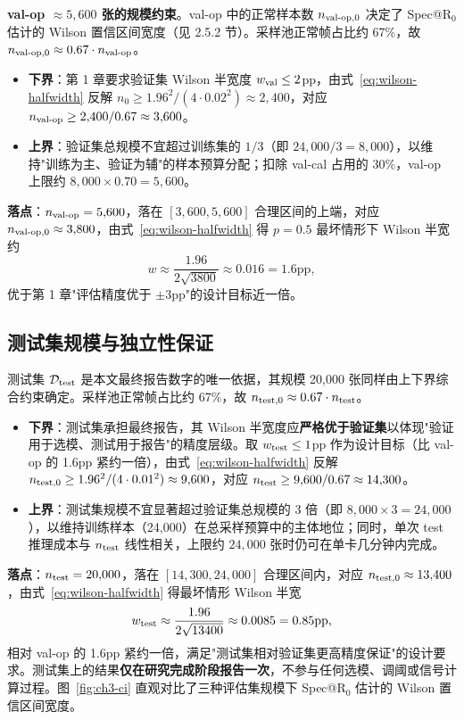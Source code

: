 \documentclass[UTF8,openany,12pt]{ctexbook}
\begin{document}
\textbf{val-op $\approx 5{,}600$ 张的规模约束}。val-op 中的正常样本数 $n_{\rm val\text{-}op, 0}$ 决定了 Spec@R$_0$ 估计的 Wilson 置信区间宽度（见 2.5.2 节）。采样池正常帧占比约 67\%，故 $n_{\rm val\text{-}op, 0} \approx 0.67 \cdot n_{\rm val\text{-}op}$。
\begin{itemize}[leftmargin=2em,nosep]
\item \textbf{下界}：第 1 章要求验证集 Wilson 半宽度 $w_{\rm val} \leq 2$pp，由式~\eqref{eq:wilson-halfwidth} 反解 $n_0 \geq 1.96^2 / (4 \cdot 0.02^2) \approx 2{,}400$，对应 $n_{\rm val\text{-}op} \geq 2{,}400 / 0.67 \approx 3{,}600$。
\item \textbf{上界}：验证集总规模不宜超过训练集的 $1/3$（即 $24{,}000 / 3 = 8{,}000$），以维持"训练为主、验证为辅"的样本预算分配；扣除 val-cal 占用的 30\%，val-op 上限约 $8{,}000 \times 0.70 = 5{,}600$。
\end{itemize}
\textbf{落点}：$n_{\rm val\text{-}op} = 5{,}600$，落在 $[3{,}600, 5{,}600]$ 合理区间的上端，对应 $n_{\rm val\text{-}op, 0} \approx 3{,}800$，由式~\eqref{eq:wilson-halfwidth} 得 $p = 0.5$ 最坏情形下 Wilson 半宽约
\begin{equation}
w \approx \frac{1.96}{2\sqrt{3800}} \approx 0.016 = 1.6\text{pp},
\label{eq:val-op-ci}
\end{equation}
优于第 1 章"评估精度优于 $\pm 3$pp"的设计目标近一倍。

\subsection{测试集规模与独立性保证}
测试集 $\mathcal{D}_{\rm test}$ 是本文最终报告数字的唯一依据，其规模 20{,}000 张同样由上下界综合约束确定。采样池正常帧占比约 67\%，故 $n_{\rm test, 0} \approx 0.67 \cdot n_{\rm test}$。
\begin{itemize}[leftmargin=2em,nosep]
\item \textbf{下界}：测试集承担最终报告，其 Wilson 半宽度应\textbf{严格优于验证集}以体现"验证用于选模、测试用于报告"的精度层级。取 $w_{\rm test} \leq 1$pp 作为设计目标（比 val-op 的 1.6pp 紧约一倍），由式~\eqref{eq:wilson-halfwidth} 反解 $n_{\rm test, 0} \geq 1.96^2 / (4 \cdot 0.01^2) \approx 9{,}600$，对应 $n_{\rm test} \geq 9{,}600 / 0.67 \approx 14{,}300$。
\item \textbf{上界}：测试集规模不宜显著超过验证集总规模的 3 倍（即 $8{,}000 \times 3 = 24{,}000$），以维持训练样本（24{,}000）在总采样预算中的主体地位；同时，单次 test 推理成本与 $n_{\rm test}$ 线性相关，上限约 $24{,}000$ 张时仍可在单卡几分钟内完成。
\end{itemize}
\textbf{落点}：$n_{\rm test} = 20{,}000$，落在 $[14{,}300, 24{,}000]$ 合理区间内，对应 $n_{\rm test, 0} \approx 13{,}400$，由式~\eqref{eq:wilson-halfwidth} 得最坏情形 Wilson 半宽
\begin{equation}
w_{\rm test} \approx \frac{1.96}{2\sqrt{13400}} \approx 0.0085 = 0.85\text{pp},
\label{eq:test-ci}
\end{equation}
相对 val-op 的 1.6pp 紧约一倍，满足"测试集相对验证集更高精度保证"的设计要求。测试集上的结果\textbf{仅在研究完成阶段报告一次}，不参与任何选模、调阈或信号计算过程。图~\ref{fig:ch3-ci} 直观对比了三种评估集规模下 Spec@R$_0$ 估计的 Wilson 置信区间宽度。
\end{document}
